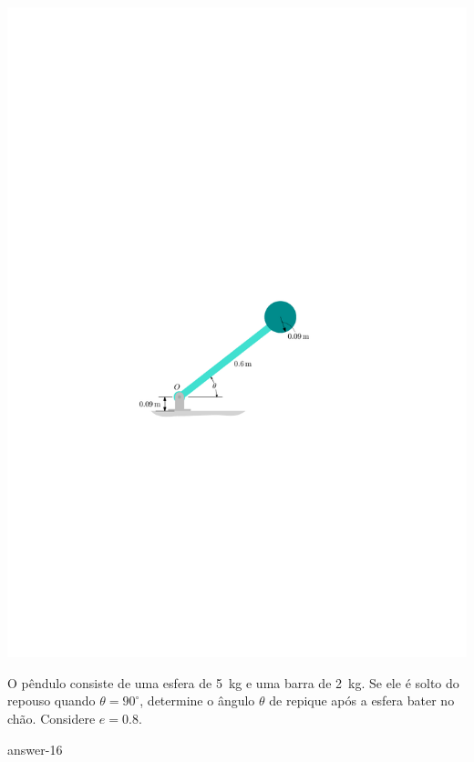 \begin{minipage}{.7\linewidth}
	\begin{flushleft}
		\includegraphics[scale=1.2]{../../images/draw_15}
	\end{flushleft}
\end{minipage}
\begin{minipage}{.3\linewidth}
	\item O pêndulo consiste de uma esfera de \SI{5}{\kilogram} e uma barra de \SI{2}{\kilogram}. Se ele é solto do repouso quando $\theta=90^{\circ}$, determine o ângulo $\theta$ de repique após a esfera bater no chão. Considere $e=0.8$.
	
	{answer-16}
\end{minipage}